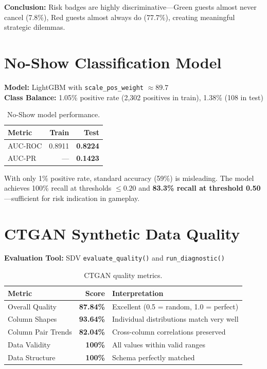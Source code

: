 \documentclass[12pt,a4paper,openany]{report}
\begin{document}
\textbf{Conclusion:} Risk badges are highly discriminative---Green guests almost never cancel (7.8\%), Red guests almost always do (77.7\%), creating meaningful strategic dilemmas.

\section{No-Show Classification Model}

\textbf{Model:} LightGBM with \texttt{scale\_pos\_weight} $\approx 89.7$\\
\textbf{Class Balance:} 1.05\% positive rate (2,302 positives in train), 1.38\% (108 in test)

\begin{table}[H]
\centering
\caption{No-Show model performance.}
\label{tab:noshowperf}
\begin{tabular}{@{}lrr@{}}
\toprule
\textbf{Metric} & \textbf{Train} & \textbf{Test} \\
\midrule
AUC-ROC & 0.8911 & \textbf{0.8224} \\
AUC-PR  & ---    & \textbf{0.1423} \\
\bottomrule
\end{tabular}
\end{table}

With only 1\% positive rate, standard accuracy (59\%) is misleading. The model achieves 100\% recall at thresholds $\leq 0.20$ and \textbf{83.3\% recall at threshold 0.50}---sufficient for risk indication in gameplay.

\section{CTGAN Synthetic Data Quality}

\textbf{Evaluation Tool:} SDV \texttt{evaluate\_quality()} and \texttt{run\_diagnostic()}

\begin{table}[H]
\centering
\caption{CTGAN quality metrics.}
\label{tab:ctganquality}
\begin{tabular}{@{}lrl@{}}
\toprule
\textbf{Metric} & \textbf{Score} & \textbf{Interpretation} \\
\midrule
Overall Quality    & \textbf{87.84\%} & Excellent (0.5 = random, 1.0 = perfect) \\
Column Shapes      & \textbf{93.64\%} & Individual distributions match very well \\
Column Pair Trends & \textbf{82.04\%} & Cross-column correlations preserved \\
Data Validity      & \textbf{100\%}   & All values within valid ranges \\
Data Structure     & \textbf{100\%}   & Schema perfectly matched \\
\bottomrule
\end{tabular}
\end{table}
\end{document}
